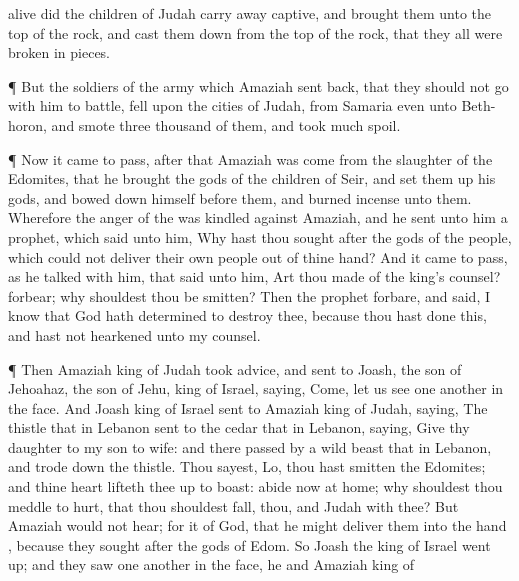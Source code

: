 {{}
alive did the
children of
Judah carry away
captive, and
brought them unto the
top of the
rock, and cast them
down from the
top of the
rock, that they all were broken in
pieces.
\par }{\PP {}¶ But the
soldiers of the
army which
Amaziah sent
back, that they should not
go with him to
battle,
fell upon the
cities of
Judah, from
Samaria even unto
Beth-horon, and
smote
three
thousand of them, and
took
much
spoil.
\par }{\PP {}¶ Now it came to pass,
after that
Amaziah was
come from the
slaughter of the
Edomites, that he
brought the
gods of the
children of
Seir, and set them
up
{} his
gods, and bowed
down himself
before them, and burned
incense unto them.
Wherefore the
anger of the
{} was
kindled against
Amaziah, and he
sent unto him a
prophet, which
said unto him, Why hast thou
sought after the
gods of the
people, which could not
deliver their own
people out of thine
hand?
And it came to pass, as he
talked with him, that
{}
said unto him, Art thou
made of the
king’s
counsel?
forbear; why shouldest thou be
smitten? Then the
prophet
forbare, and
said, I
know that
God hath
determined to
destroy thee, because thou hast
done this, and hast not
hearkened unto my
counsel.
\par }{\PP {}¶ Then
Amaziah
king of
Judah took
advice, and
sent to
Joash, the
son of
Jehoahaz, the
son of
Jehu,
king of
Israel,
saying,
Come, let us see one
another in the
face.
And
Joash
king of
Israel
sent to
Amaziah
king of
Judah,
saying, The
thistle that
{} in
Lebanon
sent to the
cedar that
{} in
Lebanon,
saying,
Give thy
daughter to my
son to
wife: and there passed
by a
wild
beast that
{} in
Lebanon, and trode
down the
thistle.
Thou
sayest, Lo, thou hast
smitten the
Edomites; and thine
heart lifteth thee
up to
boast:
abide now at
home; why shouldest thou
meddle to
{}
hurt, that thou shouldest
fall,
{} thou, and
Judah with thee?
But
Amaziah would not
hear; for it
{} of
God, that he might
deliver them into the
hand
{}, because they
sought after the
gods of
Edom.
So
Joash the
king of
Israel went
up; and they saw one
another in the
face,
{} he and
Amaziah
king of
}
